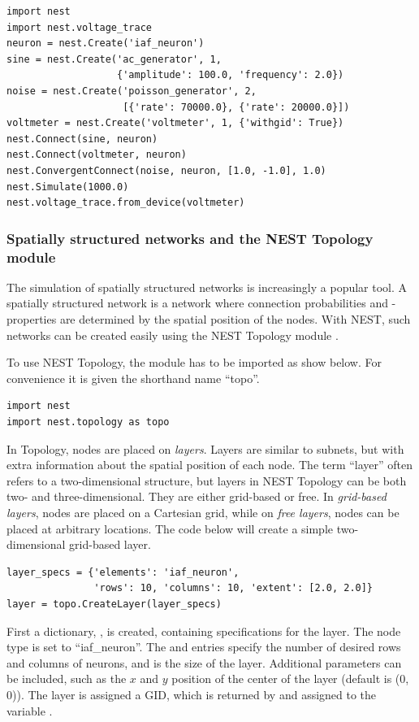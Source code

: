 \begin{lstlisting}
import nest
import nest.voltage_trace
neuron = nest.Create('iaf_neuron')
sine = nest.Create('ac_generator', 1, 
                   {'amplitude': 100.0, 'frequency': 2.0})
noise = nest.Create('poisson_generator', 2, 
                    [{'rate': 70000.0}, {'rate': 20000.0}])
voltmeter = nest.Create('voltmeter', 1, {'withgid': True})
nest.Connect(sine, neuron)
nest.Connect(voltmeter, neuron)
nest.ConvergentConnect(noise, neuron, [1.0, -1.0], 1.0)
nest.Simulate(1000.0)
nest.voltage_trace.from_device(voltmeter)
\end{lstlisting}



\subsubsection{Spatially structured networks and the NEST Topology module}

The simulation of spatially structured networks is increasingly a popular tool. A spatially structured network is a network where connection probabilities and -properties are determined by the spatial position of the nodes. With NEST, such networks can be created easily using the NEST Topology module . 

To use NEST Topology, the module has to be imported as show below. For convenience it is given the shorthand name ``topo''.
\begin{lstlisting}
import nest
import nest.topology as topo
\end{lstlisting}
In Topology, nodes are placed on \emph{layers}. Layers are similar to subnets, but with extra information about the spatial position of each node. The term ``layer'' often refers to a two-dimensional structure, but layers in NEST Topology can be both two- and three-dimensional. They are either grid-based or free. In \emph{grid-based layers}, nodes are placed on a Cartesian grid, while on \emph{free layers}, nodes can be placed at arbitrary locations. The code below will create a simple two-dimensional grid-based layer. 
\begin{lstlisting}
layer_specs = {'elements': 'iaf_neuron', 
               'rows': 10, 'columns': 10, 'extent': [2.0, 2.0]}
layer = topo.CreateLayer(layer_specs)
\end{lstlisting}
First a dictionary, , is created, containing specifications for the layer. The node type is set to ``iaf\_neuron''. The  and  entries specify the number of desired rows and columns of neurons, and  is the size of the layer. Additional parameters can be included, such as the $x$ and $y$ position of the center of the layer (default is (0, 0)). The layer is assigned a GID, which is returned by  and assigned to the variable .

